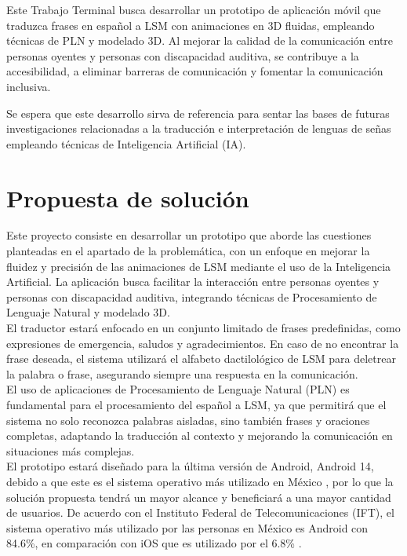 Este Trabajo Terminal busca desarrollar un prototipo de aplicación móvil que traduzca frases en español a LSM con animaciones en 3D fluidas, empleando técnicas de PLN y modelado 3D. Al mejorar la calidad de la comunicación entre personas oyentes y personas con discapacidad auditiva, se contribuye a la accesibilidad, a eliminar barreras de comunicación y fomentar la comunicación inclusiva.\\

\newpage

Se espera que este desarrollo sirva de referencia para sentar las bases de futuras investigaciones relacionadas a la traducción e interpretación de lenguas de señas empleando técnicas de Inteligencia Artificial (IA).\\

\section{Propuesta de solución}
Este proyecto consiste en desarrollar un prototipo que aborde las cuestiones planteadas en el apartado de la problemática, con un enfoque en mejorar la fluidez y precisión de las animaciones de LSM mediante el uso de la Inteligencia Artificial. La aplicación busca facilitar la interacción entre personas oyentes y personas con discapacidad auditiva, integrando técnicas de Procesamiento de Lenguaje Natural y modelado 3D.\\

El traductor estará enfocado en un conjunto limitado de frases predefinidas, como expresiones de emergencia, saludos y agradecimientos. En caso de no encontrar la frase deseada, el sistema utilizará el alfabeto dactilológico de LSM para deletrear la palabra o frase, asegurando siempre una respuesta en la comunicación.\\

El uso de aplicaciones de Procesamiento de Lenguaje Natural (PLN) es fundamental para el procesamiento del español a LSM, ya que permitirá que el sistema no solo reconozca palabras aisladas, sino también frases y oraciones completas, adaptando la traducción al contexto y mejorando la comunicación en situaciones más complejas.\\

El prototipo estará diseñado para la última versión de Android, Android 14, debido a que este es el sistema operativo más utilizado en México \cite{ref5}, por lo que la solución propuesta tendrá un mayor alcance y beneficiará a una mayor cantidad de usuarios. De acuerdo con el Instituto Federal de Telecomunicaciones (IFT), el sistema operativo más utilizado por las personas en México es Android con 84.6\%, en comparación con iOS que es utilizado por el 6.8\% \cite{ref6}.\\

